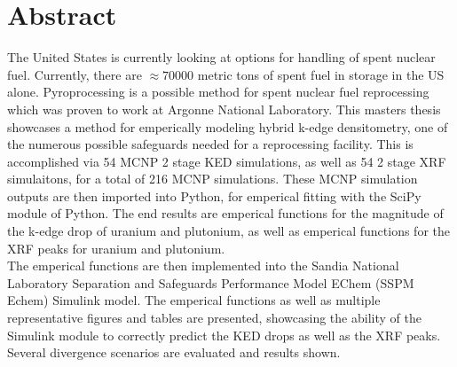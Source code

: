 \chapter*{Abstract}\label{ch:abstract}
The United States is currently looking at options for handling of spent nuclear fuel. Currently, there are $\approx 70000$ metric tons of spent fuel in storage in the US alone. Pyroprocessing is a possible method for spent nuclear fuel reprocessing which was proven to work at Argonne National Laboratory. This masters thesis showcases a method for emperically modeling hybrid k-edge densitometry, one of the numerous possible safeguards needed for a reprocessing facility. This is accomplished via 54 MCNP 2 stage KED simulations, as well as 54 2 stage XRF simulaitons, for a total of 216 MCNP simulations. These MCNP simulation outputs are then imported into Python, for emperical fitting with the SciPy module of Python. The end results are emperical functions for the magnitude of the k-edge drop of uranium and plutonium, as well as emperical functions for the XRF peaks for uranium and plutonium. \\

The emperical functions are then implemented into the Sandia National Laboratory Separation and Safeguards Performance Model EChem (SSPM Echem) Simulink model. The emperical functions as well as multiple representative figures and tables are presented, showcasing the ability of the Simulink module to correctly predict the KED drops as well as the XRF peaks. Several divergence scenarios are evaluated and results shown.\\